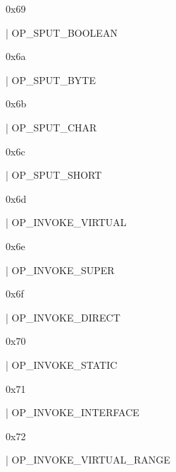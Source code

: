 \documentclass[11pt]{article}
\begin{document}
\begin{ocamldoccomment}
0x69
\end{ocamldoccomment}
\begin{ocamldoccode}
  | OP_SPUT_BOOLEAN
\end{ocamldoccode}
\begin{ocamldoccomment}
0x6a
\end{ocamldoccomment}
\begin{ocamldoccode}
  | OP_SPUT_BYTE
\end{ocamldoccode}
\begin{ocamldoccomment}
0x6b
\end{ocamldoccomment}
\begin{ocamldoccode}
  | OP_SPUT_CHAR
\end{ocamldoccode}
\begin{ocamldoccomment}
0x6c
\end{ocamldoccomment}
\begin{ocamldoccode}
  | OP_SPUT_SHORT
\end{ocamldoccode}
\begin{ocamldoccomment}
0x6d
\end{ocamldoccomment}
\begin{ocamldoccode}
  | OP_INVOKE_VIRTUAL
\end{ocamldoccode}
\begin{ocamldoccomment}
0x6e
\end{ocamldoccomment}
\begin{ocamldoccode}
  | OP_INVOKE_SUPER
\end{ocamldoccode}
\begin{ocamldoccomment}
0x6f
\end{ocamldoccomment}
\begin{ocamldoccode}
  | OP_INVOKE_DIRECT
\end{ocamldoccode}
\begin{ocamldoccomment}
0x70
\end{ocamldoccomment}
\begin{ocamldoccode}
  | OP_INVOKE_STATIC
\end{ocamldoccode}
\begin{ocamldoccomment}
0x71
\end{ocamldoccomment}
\begin{ocamldoccode}
  | OP_INVOKE_INTERFACE
\end{ocamldoccode}
\begin{ocamldoccomment}
0x72
\end{ocamldoccomment}
\begin{ocamldoccode}
  | OP_INVOKE_VIRTUAL_RANGE
\end{ocamldoccode}
\end{document}
